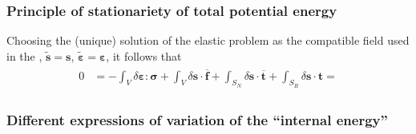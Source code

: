 \documentclass[letterpaper,10pt,english]{jupyterBook}
\begin{document}
\subsubsection{Principle of stationariety of total potential energy}
\label{\detokenize{ch/solids/small-displacements-statics-weak-form-3d:principle-of-stationariety-of-total-potential-energy}}\label{\detokenize{ch/solids/small-displacements-statics-weak-form-3d:solid-mechanics-intro-small-displacements-statics-weak-form-weak-stationariety-potential}}
\sphinxAtStartPar
Choosing the (unique) solution of the elastic problem as the compatible field used in the {\hyperref[\detokenize{ch/solids/small-displacements-statics-weak-form-3d:solid-mechanics-intro-small-displacements-statics-weak-form-weak-pvw}]{}}, \(\widetilde{\mathbf{s}} = \mathbf{s}\), \(\widetilde{\boldsymbol{\varepsilon}} = \boldsymbol{\varepsilon}\), it follows that
\begin{equation*}
\begin{split}\begin{aligned}
 0 & = - \int_V \delta \boldsymbol\varepsilon : \boldsymbol\sigma + \int_{V} \delta \mathbf{s} \cdot \overline{\mathbf{f}} + \int_{S_N} \delta \mathbf{s} \cdot \overline{\mathbf{t}} + \int_{S_R} \delta \mathbf{s} \cdot \mathbf{t} =  
\end{aligned}\end{split}
\end{equation*}\subsubsection*{Different expressions of variation of the “internal energy”}
\end{document}
